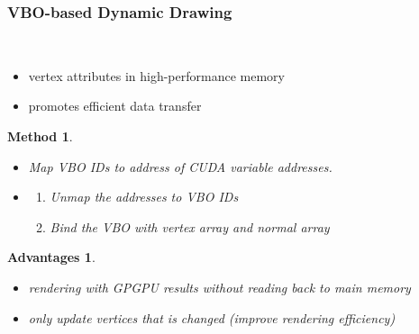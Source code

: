 \documentclass[8pt]{beamer}
\newtheorem{advantage}{Advantages}
\newtheorem{method}{Method}
\begin{document}
\begin{frame}
  \frametitle{VBO-based Dynamic Drawing}
   \\
  \begin{itemize}
  \item vertex attributes in high-performance memory
  \item promotes efficient data transfer
  \end{itemize}
  \begin{method}
    \begin{itemize}
    \item {} Map VBO IDs to address of CUDA
      variable addresses.
    \item {}
      \begin{enumerate}
      \item Unmap the addresses to VBO IDs 
      \item Bind the VBO with vertex array and normal array
      \end{enumerate}
    \end{itemize}
  \end{method}
  \begin{advantage}
    \begin{itemize}
    \item rendering with GPGPU results without reading back to main memory
    \item only update vertices that is changed (improve rendering efficiency)
    \end{itemize}
  \end{advantage}
\end{frame}
\note{}

  

\end{document}
